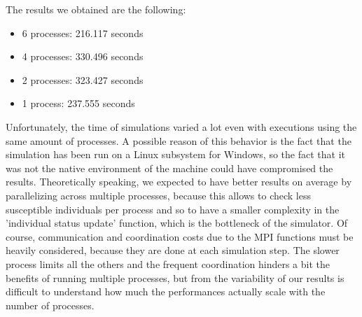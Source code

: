 \documentclass[10pt]{article}
\begin{document}
	The results we obtained are the following:
	\begin{itemize}
		\item 6 processes: 216.117 seconds
		\item 4 processes: 330.496 seconds
		\item 2 processes: 323.427 seconds
		\item 1 process: 237.555 seconds
	\end{itemize}

	Unfortunately, the time of simulations varied a lot even with executions using the same amount of processes. A possible reason of this behavior is the fact that the simulation has been run on a Linux subsystem for Windows, so the fact that it was not the native environment of the machine could have compromised the results.
	Theoretically speaking, we expected to have better results on average by parallelizing across multiple processes, because this allows to check less susceptible individuals per process and so to have a smaller complexity in the 'individual status update' function, which is the bottleneck of the simulator. Of course, communication and coordination costs due to the MPI functions must be heavily considered, because they are done at each simulation step. The slower process limits all the others and the frequent coordination hinders a bit the benefits of running multiple processes, but from the variability of our results is difficult to understand how much the performances actually scale with the number of processes.
	
\end{document}
